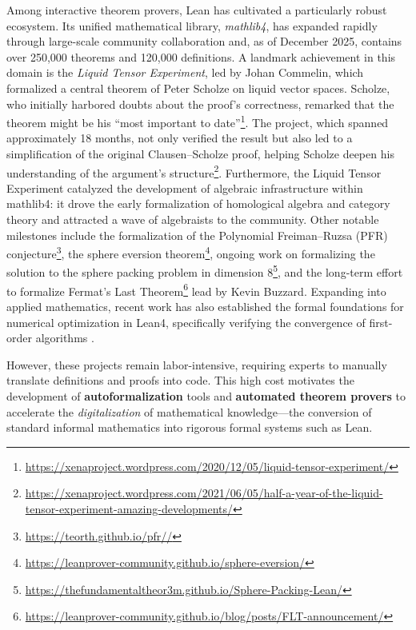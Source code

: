 \documentclass[11pt]{article}
\numberwithin{equation}{section}
\begin{document}
Among interactive theorem provers, Lean \cite{DBLP:conf/cade/MouraKADR15,DBLP:conf/cade/Moura021} has cultivated a particularly robust ecosystem. Its unified mathematical library, \textit{mathlib4}, has expanded rapidly through large-scale community collaboration and, as of December 2025, contains over 250,000 theorems and 120,000 definitions. A landmark achievement in this domain is the \textit{Liquid Tensor Experiment}, led by Johan Commelin, which formalized a central theorem of Peter Scholze on liquid vector spaces. Scholze, who initially harbored doubts about the proof's correctness, remarked that the theorem might be his ``most important to date''\footnote{\href{https://xenaproject.wordpress.com/2020/12/05/liquid-tensor-experiment/}{https://xenaproject.wordpress.com/2020/12/05/liquid-tensor-experiment/}}. The project, which spanned approximately 18 months, not only verified the result but also led to a simplification of the original Clausen--Scholze proof, helping Scholze deepen his understanding of the argument's structure\footnote{\href{https://xenaproject.wordpress.com/2021/06/05/half-a-year-of-the-liquid-tensor-experiment-amazing-developments/}{https://xenaproject.wordpress.com/2021/06/05/half-a-year-of-the-liquid-tensor-experiment-amazing-developments/}}. Furthermore, the Liquid Tensor Experiment catalyzed the development of algebraic infrastructure within mathlib4: it drove the early formalization of homological algebra and category theory and attracted a wave of algebraists to the community. Other notable milestones include the formalization of the Polynomial Freiman--Ruzsa (PFR) conjecture\footnote{\href{https://teorth.github.io/pfr//}{https://teorth.github.io/pfr//}}, the sphere eversion theorem\footnote{\href{https://leanprover-community.github.io/sphere-eversion/}{https://leanprover-community.github.io/sphere-eversion/}}, ongoing work on formalizing the solution to the sphere packing problem in dimension 8\footnote{\href{https://thefundamentaltheor3m.github.io/Sphere-Packing-Lean/}{https://thefundamentaltheor3m.github.io/Sphere-Packing-Lean/}}, and the long-term effort to formalize Fermat’s Last Theorem\footnote{\href{https://leanprover-community.github.io/blog/posts/FLT-announcement/}{https://leanprover-community.github.io/blog/posts/FLT-announcement/}} lead by Kevin Buzzard. Expanding into applied mathematics, recent work has also established the formal foundations for numerical optimization in Lean4, specifically verifying the convergence of first-order algorithms \cite{li2025formalization}.

However, these projects remain labor-intensive, requiring experts to manually translate definitions and proofs into code. This high cost motivates the development of \textbf{autoformalization} tools and \textbf{automated theorem provers} to accelerate the \textit{digitalization} of mathematical knowledge—the conversion of standard informal mathematics into rigorous formal systems such as Lean.
\end{document}
